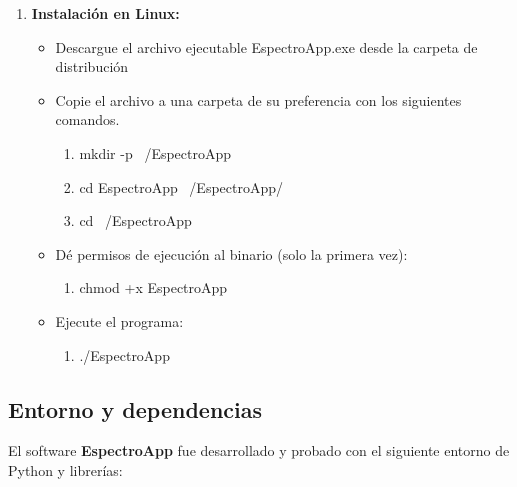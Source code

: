 \documentclass[12pt]{article}
\begin{document}
\begin{enumerate}
    
        \item \textbf{Instalación en Linux:}
        \begin{itemize}
            \item Descargue el archivo ejecutable EspectroApp.exe desde la carpeta de distribución
            \item Copie el archivo a una carpeta de su preferencia con los siguientes comandos.
                \begin{enumerate}
                    \item mkdir -p ~/EspectroApp
                    \item cd EspectroApp ~/EspectroApp/
                    \item cd ~/EspectroApp
                \end{enumerate}
            \item Dé permisos de ejecución al binario (solo la primera vez):
                \begin{enumerate}
                    \item chmod +x EspectroApp
                \end{enumerate}
            \item Ejecute el programa:
                \begin{enumerate}
                    \item ./EspectroApp
                \end{enumerate}
        \end{itemize}
    \end{enumerate}
        
\newpage   
    \subsection*{Entorno y dependencias}
    
    El software \textbf{EspectroApp} fue desarrollado y probado con el siguiente entorno de Python y librerías:
    
\end{document}
